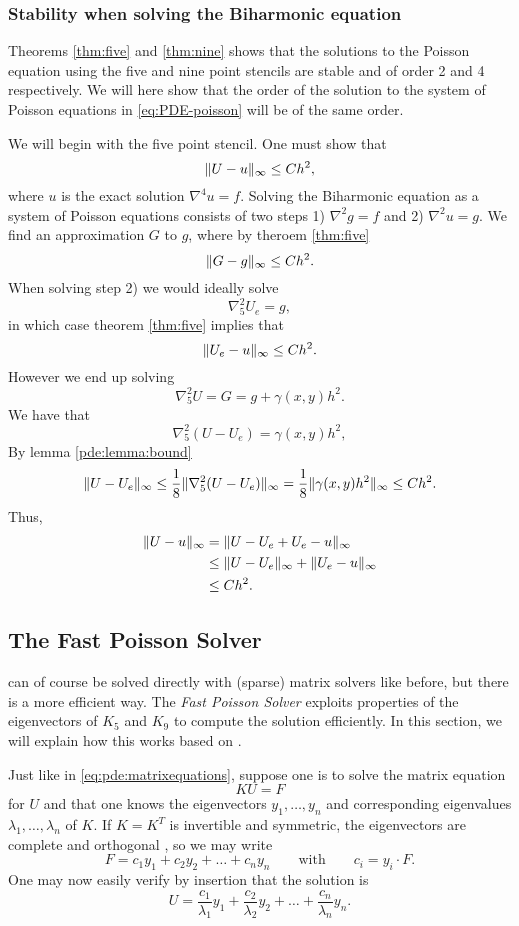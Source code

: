\subsubsection{Stability when solving the Biharmonic equation}
Theorems \ref{thm:five} and \ref{thm:nine} shows that the solutions to the Poisson equation using the five and nine point stencils are stable and of order 2 and 4 respectively.
We will here show that the order of the solution to the system of Poisson equations in \eqref{eq:PDE-poisson} will be of the same order.

We will begin with the five point stencil.
One must show that
$$
\lVert U - u \rVert_\infty \leq Ch^2,
$$
where $u$ is the exact solution $\nabla^4 u = f$.
Solving the Biharmonic equation as a system of Poisson equations consists of two steps 1) $\nabla^2 g = f$ and 2) $\nabla^2 u = g$.
We find an approximation $G$ to $g$, where by theroem \ref{thm:five}
$$
\lVert G - g \rVert_\infty \leq C h^2.
$$
When solving step 2) we would ideally solve
$$
\nabla_5^2 U_e = g,
$$
in which case theorem \ref{thm:five} implies that
$$
\lVert U_e - u \rVert_\infty \leq C h^2.
$$
However we end up solving
$$
\nabla_5^2 U = G = g + \gamma(x, y) h^2.
$$
We have that
\begin{equation}
  \nabla_5^2 (U - U_e) = \gamma(x, y) h^2,
\end{equation}
By lemma \ref{pde:lemma:bound}
$$
\lVert U - U_e \rVert_\infty \leq \frac18 \lVert \nabla_5^2 (U - U_e) \rVert_\infty = \frac18 \lVert \gamma(x, y) h^2 \rVert_\infty \leq C h^2.
$$
Thus,
\begin{align*}
  \lVert U - u \rVert_\infty &= \lVert U - U_e + U_e - u \rVert_\infty\\
  &\leq \lVert U - U_e \rVert_\infty + \lVert U_e - u \rVert_\infty\\
  &\leq C h^2.
\end{align*}


\subsection{The Fast Poisson Solver}
 can of course be solved directly with (sparse) matrix solvers like before, but there is a more efficient way.
The \emph{Fast Poisson Solver} exploits properties of the eigenvectors of $K_5$ and $K_9$ to compute the solution efficiently.
In this section, we will explain how this works based on \cite{Strang_2012}.

Just like in \cref{eq:pde:matrixequations}, suppose one is to solve the matrix equation 
$$
K U = F
$$
for $U$ and that one knows the eigenvectors $y_1, \dots, y_n$ and corresponding eigenvalues $\lambda_1, \dots, \lambda_n$ of $K$.
If $K = K^T$ is invertible and symmetric, the eigenvectors are complete and orthogonal \cite{owren}, so we may write
\begin{equation}
F = c_1 y_1 + c_2 y_2 + \dots + c_n y_n
\qquad \text{with} \qquad
c_i = y_i \cdot F.
\label{eq:pde:fexpansion}
\end{equation}
One may now easily verify by insertion that the solution is
\begin{equation}
U =
\frac{c_1}{\lambda_1} y_1
+ \frac{c_2}{\lambda_2} y_2
+ \dots
+ \frac{c_n}{\lambda_n} y_n.
\label{eq:pde:insertionsolution}
\end{equation}

